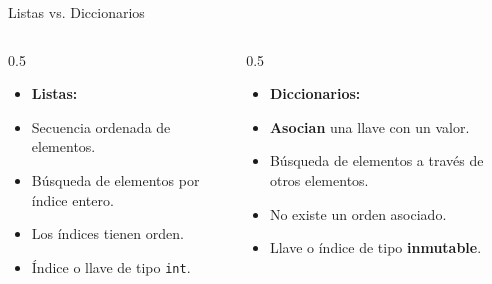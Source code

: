 \documentclass[mathserif]{beamer}
\begin{document}
\begin{frame}[fragile]{Listas vs. Diccionarios}
    \begin{columns}
        \begin{column}{0.5\textwidth}
        \begin{itemize}
            \item {\blue\bfseries Listas:}
            \item Secuencia {\blue ordenada} de elementos.
            \item Búsqueda de elementos por índice entero.
            \item Los índices tienen orden.
            \item Índice o llave de tipo \lstinline|int|.
            
        \end{itemize}
        \end{column}
        \begin{column}{0.5\textwidth}
        \begin{itemize}
            \item {\blue\bfseries Diccionarios:}
            \item {\orange\bfseries Asocian} una llave con un valor.
            \item Búsqueda de elementos a través de otros elementos.
            \item No existe un orden asociado.
            \item Llave o índice de tipo {\blue\bfseries inmutable}.
        \end{itemize}
        \end{column}
    \end{columns}
\end{frame}
\end{document}
